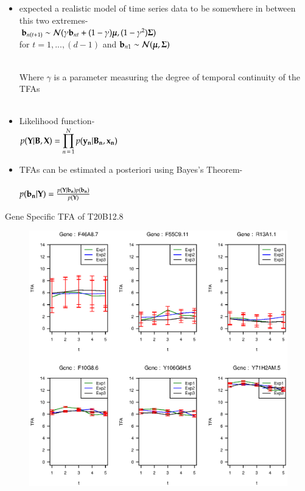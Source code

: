\documentclass[serif,mathserif,final]{beamer}
\begin{document}
\begin{frame}{}
\begin{columns}[t]
\begin{column}{0.24\linewidth}
\begin{block}{}
	\begin{itemize}
	\item  \cite{p2}  expected a realistic model of time series data to be somewhere in between this two extremes- \\
	\centering $ \bold{b}_{n(t+1)} \sim \mathcal{N} (\gamma \bold{b}_{nt} + (1-\gamma)\boldsymbol{\mu},(1-\gamma^2)\bold{\Sigma})$ \\
	for $ t= 1, ... , (d-1)$ and $ \bold{b}_{n1} \sim \mathcal{N} ( \boldsymbol{\mu},\bold{\Sigma})$
	\raggedright
	\\ Where $ \gamma $ is a parameter measuring the degree of temporal continuity of the TFAs \\~\\

	\item Likelihood function-\\
	\centering 
	$p(\bold{Y|B,X})= \displaystyle \prod_{n \mathop = 1}^{N} p(\bold{y_n|B_n,x_n})$

	\raggedright
	\item TFAs can be estimated a posteriori using Bayes’s Theorem- \\~\\
	\centering 
	$ p(\bold{b_n|Y})= \frac {p(\bold{Y|b_n})p(\bold{b_n})}{p(\bold{Y})} $

	\end {itemize}
      
      \end{block}

      
      
      \begin{block}{Gene Specific TFA of T20B12.8}
    
      \begin{figure}
      \includegraphics[width=0.6\linewidth]{picture/T20B12_8_3.eps}
      \end{figure}


\end{block}
\end{column}
\end{columns}
\end{frame}
\end{document}
